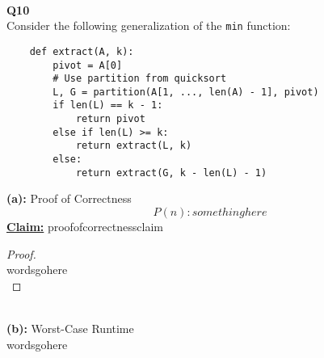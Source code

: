 \documentclass[12pt]{article}
\begin{document}
\leavevmode\\
\textbf{Q10} \\
Consider the following generalization of the \texttt{min} function:
\begin{lstlisting}
    def extract(A, k):
        pivot = A[0]
        # Use partition from quicksort
        L, G = partition(A[1, ..., len(A) - 1], pivot)
        if len(L) == k - 1:
            return pivot
        else if len(L) >= k:
            return extract(L, k)
        else:
            return extract(G, k - len(L) - 1)
\end{lstlisting}
\textbf{(a):} Proof of Correctness \\
\[P(n): somethinghere\]
\textbf{\underline{Claim:}} proofofcorrectnessclaim
\begin{proof}
\leavevmode\\
    wordsgohere \\
\end{proof}
\leavevmode\\
\textbf{(b):} Worst-Case Runtime \\
wordsgohere \\
\\
\pagebreak
\end{document}
